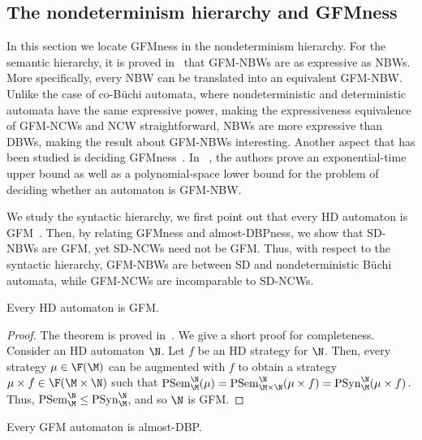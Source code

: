 \documentclass{lmcs}
\begin{document}
\subsection{The nondeterminism hierarchy and GFMness}

In this section we locate GFMness in the nondeterminism hierarchy. For the semantic hierarchy, it is proved in~\cite{HPSSTWW20} that GFM-NBWs are as expressive as NBWs. More specifically, every NBW can be translated into an equivalent GFM-NBW. Unlike the case of co-B\"uchi automata, where nondeterministic and deterministic automata have the same expressive power, making the expressiveness equivalence of GFM-NCWs and NCW straightforward,  NBWs are more expressive than DBWs, making the result about GFM-NBWs interesting. Another aspect that has been studied is deciding GFMness~\cite{STZ22}. In ~\cite{STZ22},  the authors prove an exponential-time upper bound as well as  a polynomial-space lower  bound for the problem of deciding whether an automaton is GFM-NBW. 

We study the syntactic hierarchy, we first point out that every HD automaton is GFM~\cite{KMBK14}. 
Then, by relating GFMness and almost-DBPness, we show that SD-NBWs are GFM, yet SD-NCWs need not be GFM. Thus, with respect to the syntactic hierarchy, GFM-NBWs are between SD and nondeterministic B\"uchi automata, while GFM-NCWs are incomparable to SD-NCWs.
 
\begin{thmC}
\label{hd implies gfm}
	Every HD automaton is GFM.
\end{thmC}

\begin{proof}
	The theorem is proved in~\cite{KMBK14}. We give a short proof for completeness.
Consider an HD automaton $\N$. Let $f$ be an HD strategy for $\N$. Then, every strategy $\mu\in\F(\M)$ can be augmented with $f$ to obtain a strategy $\mu\times f\in \F(\M\times \N)$ such that $\mathrm{PSem}^\N_{\M}(\mu)=\mathrm{PSem}^\N_{\M\times \N}(\mu\times f)=\mathrm{PSyn}^\N_\M(\mu\times f)$. Thus, $\mathrm{PSem}^\N_\M\leq \mathrm{PSyn}^\N_\M$, and so $\N$ is GFM.
\end{proof}



\begin{thm}
	\label{gfm-nbw almost}
	Every GFM automaton is almost-DBP.
\end{thm}
\end{document}
